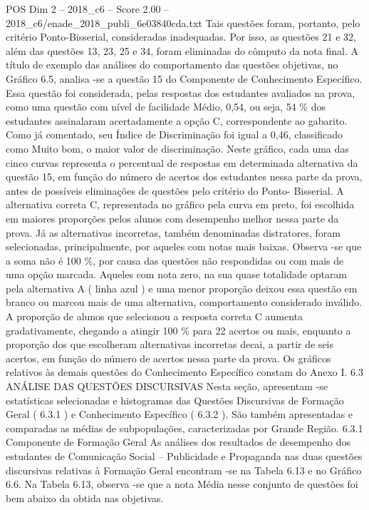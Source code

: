 \begin{textsample}{POS Dim 2 – 2018\_c6 – Score 2.00 – 2018\_c6/enade\_2018\_publi\_6e03840cda.txt}
Tais questões foram, portanto, pelo critério Ponto-Bisserial, consideradas inadequadas.
Por isso, as questões 21 e 32, além das questões 13, 23, 25 e 34, foram eliminadas do cômputo da nota final.
A título de exemplo das análises do comportamento das questões objetivas, no Gráfico 6.5, analisa -se a questão 15 do Componente de Conhecimento Específico.
Essa questão foi considerada, pelas respostas dos estudantes avaliados na prova, como uma questão com nível de facilidade Médio, 0,54, ou seja, 54 \% dos estudantes assinalaram acertadamente a opção C, correspondente ao gabarito.
Como já comentado, seu Índice de Discriminação foi igual a 0,46, classificado como Muito bom, o maior valor de discriminação.
Neste gráfico, cada uma das cinco curvas representa o percentual de respostas em determinada alternativa da questão 15, em função do número de acertos dos estudantes nessa parte da prova, antes de possíveis eliminações de questões pelo critério do Ponto- Bisserial.
A alternativa correta C, representada no gráfico pela curva em preto, foi escolhida em maiores proporções pelos alunos com desempenho melhor nessa parte da prova.
Já as alternativas incorretas, também denominadas distratores, foram selecionadas, principalmente, por aqueles com notas mais baixas.
Observa -se que a soma não é 100 \%, por causa das questões não respondidas ou com mais de uma opção marcada.
Aqueles com nota zero, na sua quase totalidade optaram pela alternativa A ( linha azul ) e uma menor proporção deixou essa questão em branco ou marcou mais de uma alternativa, comportamento considerado inválido.
A proporção de alunos que selecionou a resposta correta C aumenta gradativamente, chegando a atingir 100 \% para 22 acertos ou mais, enquanto a proporção dos que escolheram alternativas incorretas decai, a partir de seis acertos, em função do número de acertos nessa parte da prova.
Os gráficos relativos às demais questões do Conhecimento Específico constam do Anexo I. 6.3 ANÁLISE DAS QUESTÕES DISCURSIVAS Nesta seção, apresentam -se estatísticas selecionadas e histogramas das Questões Discursivas de Formação Geral ( 6.3.1 ) e Conhecimento Específico ( 6.3.2 ).
São também apresentadas e comparadas as médias de subpopulações, caracterizadas por Grande Região. 6.3.1 Componente de Formação Geral As análises dos resultados de desempenho dos estudantes de Comunicação Social – Publicidade e Propaganda nas duas questões discursivas relativas à Formação Geral encontram -se na Tabela 6.13 e no Gráfico 6.6.
Na Tabela 6.13, observa -se que a nota Média nesse conjunto de questões foi bem abaixo da obtida nas objetivas.

\end{textsample}
